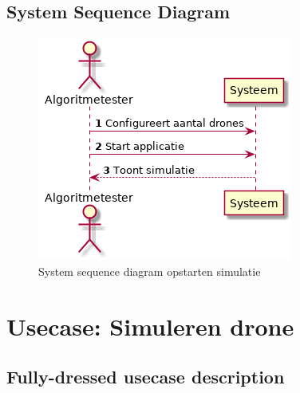 \documentclass[a4paper, 11pt, oneside]{report}
\begin{document}
\label{Usecase:simulatiedronenetwerk:fully-dressed}
\subsection{System Sequence Diagram}
\label{Usecase:simulatiedronenetwerk:systemsequence}
\begin{figure}[H]
	\begin{center}\includegraphics[height=.2\textheight]{UML/out/usecase/sequence/SimulerenDronenetwerk/SimulerenDronenetwerk.png}\end{center}
	\caption{System sequence diagram opstarten simulatie}
	\label{fig:simulatiedronenetwerk:systemsequence}
\end{figure}


\section[Simuleren drone]{Usecase: Simuleren drone}
\label{Usecase:simulatiedrone}
\subsection{Fully-dressed usecase description}
\end{document}
